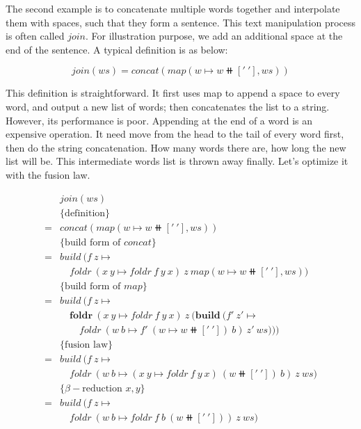 \documentclass{article}
\begin{document}
\begin{example}
\normalfont
The second example is to concatenate multiple words together and interpolate them with spaces, such that they form a sentence. This text manipulation process is often called $join$. For illustration purpose, we add an additional space at the end of the sentence. A typical definition is as below:

\[
join(ws) = concat(map(w \mapsto w \doubleplus ['\ '], ws))
\]

This definition is straightforward. It first uses map to append a space to every word, and output a new list of words; then concatenates the list to a string. However, its performance is poor. Appending at the end of a word is an expensive operation. It need move from the head to the tail of every word first, then do the string concatenation. How many words there are, how long the new list will be. This intermediate words list is thrown away finally. Let's optimize it with the fusion law.

\[ \begin{array}{rl}
  & join(ws) \\
  & \{\text{definition} \} \\
= & concat(map(w \mapsto w \doubleplus ['\ '], ws)) \\

  & \{\text{build form of } concat\} \\
= & build\ (f\ z \mapsto \\
  & \quad foldr\ (x\ y \mapsto foldr\ f\ y\ x)\ z\ map(w \mapsto w \doubleplus ['\ '], ws)) \\

  & \{\text{build form of } map\} \\
= & build\ (f\ z \mapsto \\
  & \quad \pmb{foldr}\ (x\ y \mapsto foldr\ f\ y\ x)\ z\ (\pmb{build}\ (f'\ z' \mapsto \\
  & \quad \quad foldr\ (w\ b \mapsto f'\ (w \mapsto w \doubleplus ['\ '])\ b)\ z'\ ws))) \\

  & \{\text{fusion law}\} \\
= & build\ (f\ z \mapsto \\
  & \quad foldr\ (w\ b \mapsto (x\ y \mapsto foldr\ f\ y\ x)\ (w \doubleplus ['\ '])\ b)\ z\ ws) \\

  & \{\beta-\text{reduction } x, y\} \\
= & build\ (f\ z \mapsto \\
  & \quad foldr\ (w\ b \mapsto foldr\ f\ b\ (w \doubleplus ['\ ']))\ z\ ws) \\


\end{array}\]
\end{example}
\end{document}
